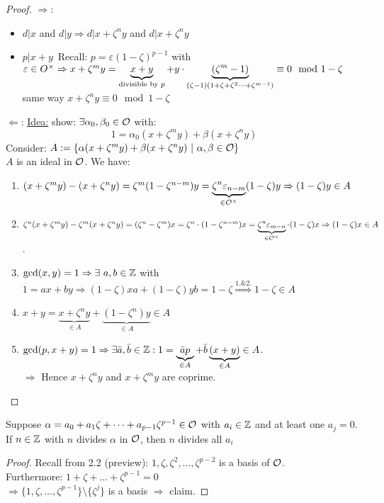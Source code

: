 \begin{proof}
\glqq $\Rightarrow$\grqq: \begin{itemize}
\item $d|x$ and $d|y \Rightarrow d|x+\zeta^ny$ and $d| x+\zeta^ny$ \Lightning
\item \glqq $p| x+y$\grqq\ Recall: $p= \varepsilon (1-\zeta)^{p-1}$ with $\varepsilon \in O^\times\\
\Rightarrow x+\zeta^my = \underbrace{x+y}_{\text{divisible by } p} +y\cdot\underbrace{(\zeta^m-1)}_{(\zeta-1)(1+\zeta+\zeta^2\dots + \zeta^{m-1})} \equiv 0 \mod 1-\zeta$\\
same way $x+\zeta^ny \equiv 0 \mod 1- \zeta$ \Lightning
\end{itemize}
\glqq $\Leftarrow$\grqq: \underline{Idea:} show: $\exists \alpha_0, \beta_0 \in \mathcal{O}$ with:
\[1= \alpha_0(x+\zeta^m y) + \beta (x+ \zeta^ny)\]
Consider: $A:= \{\alpha (x+\zeta^my)+\beta(x+\zeta^ny) \ | \ \alpha,\beta \in \mathcal{O} \}$\\
$A$ is an ideal in $\mathcal{O}$. We have:
\begin{enumerate}
\item $(x+\zeta^m y) - (x+\zeta^n y) = \zeta^m(1-\zeta^{n-m})y= \underbrace{\zeta^n\varepsilon_{n-m}}_{\in \mathcal{O}^\times} (1 - \zeta)y \Rightarrow (1 - \zeta)y \in A$
\item $\zeta^n (x+ \zeta^my) - \zeta^m(x+\zeta^ny)=(\zeta^n-\zeta^m)x= \zeta^n\cdot(1-\zeta^{n-m})x=\underbrace{\zeta^n \varepsilon_{m-n}}_{\in \mathcal{O}^\times} \cdot (1- \zeta)x \Rightarrow (1- \zeta) x \in A$.
\item $\gcd(x,y)=1 \Rightarrow \exists \ a,b \in \mathbb{Z}$ with $1=ax+by \Rightarrow (1-\zeta)xa +(1-\zeta)yb = 1-\zeta \stackrel{1.\& 2.}{\Rightarrow} 1- \zeta \in A$
\item $x+y = \underbrace{x+ \zeta^ny}_{\in A} + \underbrace{(1- \zeta^n)y}_{\in A} \in A$
\item $\gcd(p,x+y)=1 \Rightarrow \exists \bar{a}, \bar{b} \in \mathbb{Z}: 1= \underbrace{\bar{a}p}_{\in A}+\bar{b}\underbrace{(x+y)}_{\in A} \in A$.\\
$\Rightarrow$ Hence $x+\zeta^ny$ and $x+ \zeta^my$ are coprime.
\end{enumerate}
\end{proof}

\begin{Bem}
Suppose $\alpha = a_0 + a_1 \zeta + \dots + a_{p-1}\zeta^{p-1} \in \mathcal{O}$ with $a_i \in \mathbb{Z}$ and at least one $a_j =0$.\\
If $n \in \mathbb{Z}$ with $n$ divides $\alpha$ in $\mathcal{O}$, then $n$ divides all $a_i$
\end{Bem}
\begin{proof}
Recall from 2.2 (preview): $1, \zeta, \zeta^2, \dots, \zeta^{p-2}$ is a basis of $\mathcal{O}$.\\
Furthermore: $1+\zeta+\dots+\zeta^{p-1}=0$\\
$\Rightarrow \{1, \zeta, \dots, \zeta^{p-1}\} \setminus \{\zeta^j\}$ is a basis $\Rightarrow$ claim.
\end{proof}

